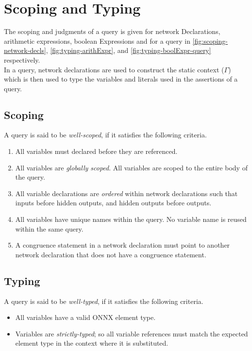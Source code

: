 \section{Scoping and Typing}
\label{sec:scoping_and_typing}
The scoping and judgments of a \vnnlib{} query is given for network Declarations, arithmetic expressions, boolean Expressions and for a query in \autoref{fig:scoping-network-decls}, \autoref{fig:typing-arithExpr}, and \autoref{fig:typing-boolExpr-query} respectively. \\
In a \vnnlib{} query, network declarations are used to construct the static context ($\Gamma$) which is then used to type the variables and literals used in the assertions of a query.


\subsection{Scoping}
A \vnnlib{} query is said to be \textit{well-scoped}, if it satisfies the following criteria.
\begin{enumerate}
    \item All variables must declared before they are referenced.
    \item All variables are \textit{globally scoped}. All variables are scoped to the entire body of the query.
    \item All variable declarations are \textit{ordered} within network declarations such that inputs before hidden outputs, and hidden outputs before outputs.
    \item All variables have unique names within the query. No variable name is reused within the same query.
    \item A congruence statement in a network declaration must point to another network declaration that does not have a congruence statement.
\end{enumerate}

\subsection{Typing}
A \vnnlib{} query is said to be \textit{well-typed}, if it satisfies the following criteria.

\begin{itemize}
    \item All variables have a valid ONNX element type.
    \item Variables are \textit{strictly-typed}; so all variable references must match the expected element type in the context where it is substituted.
\end{itemize}


